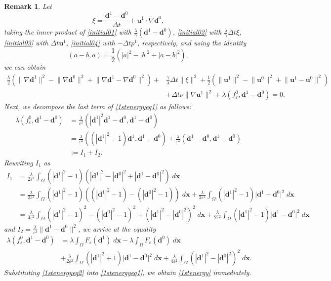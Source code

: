 \documentclass[12pt,reqno]{amsart}
\numberwithin{equation}{section}
\newtheorem{remark}{Remark}[section]
\newcommand{\uu}{\mathrm{\textbf{u}}}
\newcommand{\dd}{\mathrm{\textbf{d}}}
\newcommand{\bx}{\mathrm{\textbf{x}}}
\begin{document}
\begin{remark}
Let 
\begin{equation}\label{initial02}
\xi=\frac{\dd^{1}-\dd^{0}}{\Delta t}+ \uu^{1}\cdot \nabla \dd^{0},
\end{equation}
taking the inner product of \eqref{initial01} with $\frac{\lambda}{\gamma}(\dd^{1}-\dd^0)$, \eqref{initial02} with $\frac{\lambda}{\gamma}\Delta t\xi$, \eqref{initial03} with $\Delta t\uu^1$, \eqref{initial04} with $-\Delta t p^1$, respectively, and using the identity \begin{equation}\label{a-ba}
(a-b,a)=\frac{1}{2}\left(|a|^2-|b|^2+|a-b|^2\right),
\end{equation} 
we can obtain
\begin{align}\label{1stenergyeq1}
\frac{\lambda}{2}
\left(\lVert\nabla\dd^{1}\rVert^2-\lVert\nabla\dd^{0}\rVert^2+\lVert\nabla\dd^{1}-\nabla\dd^0\rVert^2\right)
+&\frac{\gamma}{\lambda}\Delta t\lVert\xi\rVert^2
+\frac{1}{2}
\left(\lVert\uu^{1}\rVert^2-\lVert\uu^{0}\rVert^2+\lVert\uu^{1}-\uu^0\rVert^2\right)\nonumber\\
&+\Delta t\nu\lVert\nabla\uu^{1}\rVert^2
+\lambda\left(f_\varepsilon^0,\dd^1-\dd^0\right)=0.
\end{align}
Next, we decompose the last term of \eqref{1stenergyeq1} as follows:
\begin{align*}
\lambda\left(f_\varepsilon^0,\dd^1-\dd^0\right)&=\frac{\lambda}{\varepsilon^2}\left(|\dd^{1}|^2\dd^{1}-\dd^0,\dd^1-\dd^0\right)\\
&=\frac{\lambda}{\varepsilon^2}\left(\left(|\dd^{1}|^2-1\right)\dd^{1},\dd^1-\dd^0\right)
+\frac{\lambda}{\varepsilon^2}\left(\dd^1-\dd^0,\dd^1-\dd^0\right)\\
&:=I_1+I_2.
\end{align*}
Rewriting $I_1$ as
\begin{align*}
I_1&=\frac{\lambda}{2\varepsilon^2}\int_{\Omega}\left(|\dd^{1}|^2-1\right)
\left(|\dd^{1}|^2-|\dd^{0}|^2+|\dd^1-\dd^0|^2\right)\;d\bx\\
&=\frac{\lambda}{2\varepsilon^2}\int_{\Omega}\left(|\dd^{1}|^2-1\right)\left(\left(|\dd^{1}|^2-1\right)-\left(|\dd^{0}|^2-1\right)\right)\;d\bx
+\frac{\lambda}{2\varepsilon^2}\int_{\Omega}\left(|\dd^{1}|^2-1\right)\lvert\dd^1-\dd^0\rvert^2\;d\bx\\
&=\frac{\lambda}{4\varepsilon^2}\int_{\Omega}\left(|\dd^{1}|^2-1\right)^2-\left(|\dd^{0}|^2-1\right)^2+\left(|\dd^{1}|^2-|\dd^{0}|^2\right)^2\;d\bx
+\frac{\lambda}{2\varepsilon^2}\int_{\Omega}\left(|\dd^{1}|^2-1\right)\lvert\dd^1-\dd^0\rvert^2\;d\bx
\end{align*}
and 
$I_2=\frac{\lambda}{\varepsilon^2}\lVert\dd^1-\dd^0\rVert^2$, we arrive at the equality
\begin{align}\label{1stenergyeq2}
\lambda\left(f_\varepsilon^0,\dd^1-\dd^0\right)&=\lambda\int_\Omega F_\varepsilon(\dd^1)\;d\bx-
\lambda\int_\Omega F_\varepsilon(\dd^0)\;d\bx\nonumber\\
&+
\frac{\lambda}{2\varepsilon^2}\int_{\Omega}\left(|\dd^{1}|^2+1\right)\lvert\dd^1-\dd^0\rvert^2\;d\bx
+\frac{\lambda}{4\varepsilon^2}\int_\Omega\left(|\dd^{1}|^2-|\dd^{0}|^2\right)^2\;d\bx.
\end{align}
Substituting \eqref{1stenergyeq2} into \eqref{1stenergyeq1}, we obtain \eqref{1stenergy} immediately. 
\end{remark}
\end{document}
